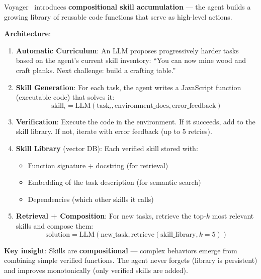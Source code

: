 Voyager~\cite{wang2023voyager} introduces \textbf{compositional skill accumulation} --- the agent builds a growing library of reusable code functions that serve as high-level actions.

\textbf{Architecture}:

\begin{enumerate}
  \item \textbf{Automatic Curriculum}: An LLM proposes progressively harder tasks based on the agent’s current skill inventory: ``You can now mine wood and craft planks. Next challenge: build a crafting table.''
  \item \textbf{Skill Generation}: For each task, the agent writes a JavaScript function (executable code) that solves it: 
\begin{equation}
\text{skill}_i = \text{LLM}(\text{task}_i, \text{environment\_docs}, \text{error\_feedback})
\end{equation}
  \item \textbf{Verification}: Execute the code in the environment. If it succeeds, add to the skill library. If not, iterate with error feedback (up to 5 retries).
  \item \textbf{Skill Library} (vector DB): Each verified skill stored with:

\begin{itemize}
  \item Function signature + docstring (for retrieval)
  \item Embedding of the task description (for semantic search)
  \item Dependencies (which other skills it calls)
\end{itemize}
  \item \textbf{Retrieval + Composition}: For new tasks, retrieve the top-$k$ most relevant skills and compose them: 
\begin{equation}
\text{solution} = \text{LLM}(\text{new\_task}, \text{retrieve}(\text{skill\_library}, k{=}5))
\end{equation}
\end{enumerate}

\textbf{Key insight}: Skills are \textbf{compositional} --- complex behaviors emerge from combining simple verified functions. The agent never forgets (library is persistent) and improves monotonically (only verified skills are added).

